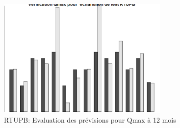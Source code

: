 \begin{figure}[H]
\centering
\includegraphics[width=0.75\textwidth]{../Fig/RTUPB/rtupb-regtree-test-qmax12.png}
\caption{RTUPB: Evaluation des prévisions pour Qmax à 12 mois}
\label{fig-rtupb-regtree-test-qmax12}
\end{figure}

